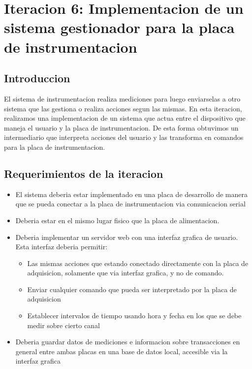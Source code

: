\chapter{Iteracion 6: Implementacion de un sistema gestionador para la placa de instrumentacion} %
\label{cha:iteracion_6}

\section{Introduccion} %
\label{sec:introduccion}

El sistema de instrumentacion realiza mediciones para luego enviarselas a otro sistema que las gestiona o realiza acciones segun las mismas. En esta iteracion, realizamos una implementacion de un sistema que actua entre el dispositivo que maneja el usuario y la placa de instrumentacion. De esta forma obtuvimos un intermediario que interpreta acciones del usuario y las transforma en comandos para la placa de instrumentacion.


\section{Requerimientos de la iteracion} %
\label{sec:requerimientos_de_la_iteracion}

\begin{itemize}
\item El sistema deberia estar implementado en una placa de desarrollo de manera que se pueda conectar a la placa de instrumentacion via comunicacion serial
\item Deberia estar en el mismo lugar fisico que la placa de alimentacion.
\item Deberia implementar un servidor web con una interfaz grafica de usuario. Esta interfaz deberia permitir:
\begin{itemize}
	\item Las mismas acciones que estando conectado directamente con la placa de adquisicion, solamente que via interfaz grafica, y no de comando.
	\item Enviar cualquier comando que pueda ser interpretado por la placa de adquisicion
	\item Establecer intervalos de tiempo usando hora y fecha en los que se debe medir sobre cierto canal
\end{itemize}
\item Deberia guardar datos de mediciones e informacion sobre transacciones en general entre ambas placas en una base de datos local, accesible via la interfaz grafica 
\end{itemize}


